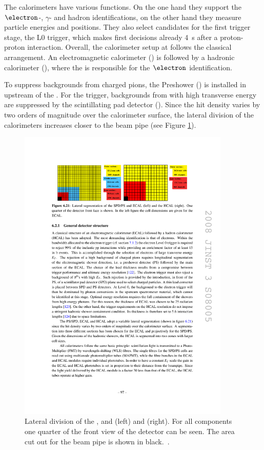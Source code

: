The calorimeters have various functions.
On the one hand they support the $\electron$-, $\gamma$- and hadron identifications, on the other hand they measure particle energies and positions.
They also select candidates for the first trigger stage, the L0 trigger, which makes first decisions already \SI{4}{\second} after a proton-proton interaction.
Overall, the calorimeter setup at \lhcb follows the classical arrangement.
An electromagnetic calorimeter (\ecal) is followed by a hadronic calorimeter (\hcal), where the \ecal is responsible for the $\electron$ identification.

To suppress backgrounds from charged pions, the Preshower (\presh) is installed in upstream of the \ecal.
For the trigger, backgrounds from \piz with high transverse energy \et are suppressed by the scintillating pad detector (\spd).
Since the hit density varies by two orders of magnitude over the calorimeter surface, the lateral division of the calorimeters increases closer to the beam pipe (see Figure \cref{fig:calorimeter}).
\begin{figure}[tbp]
    \centering
    \includegraphics[width=0.9\textwidth]{05lhcb/figs/calorimeter.pdf}
    \caption{Lateral division of the \presh, \spd and \ecal (left) and \hcal (right).
    For all components one quarter of the front view of the detector can be seen.
    The area cut out for the beam pipe is shown in black.~\cite{Alves:2008zz}.}
    \label{fig:calorimeter}
\end{figure}


